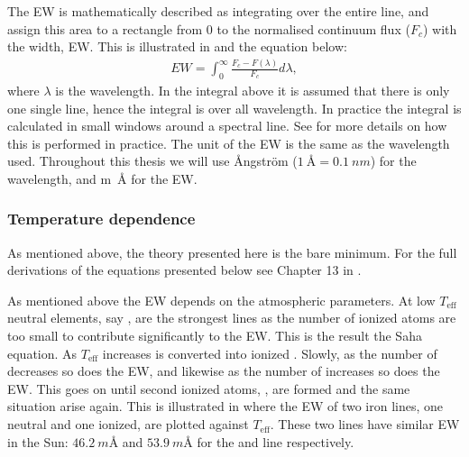 {The EW is mathematically described as integrating over the entire line, and assign this area to a
rectangle from 0 to the normalised continuum flux ($F_c$) with the width, EW. This is illustrated in
 and the equation below:
\begin{align} EW = \int_{0}^{\infty}
  \frac{F_c-F(\lambda)}{F_c} d\lambda,
\end{align}
where $\lambda$ is the wavelength. In the integral above it is assumed that there is only one single
line, hence the integral is over all wavelength. In practice the integral is calculated in small
windows around a spectral line. See  for more details on how this is performed
in practice. The unit of the EW is the same as the wavelength used. Throughout this thesis we will
use \AA{}ngstr\"{o}m ($\SI{1}{\angstrom}=\SI{0.1}{nm}$) for the wavelength, and \si{m\angstrom} for
the EW.


\subsubsection{Temperature dependence}

As mentioned above, the theory presented here is the bare minimum. For the full derivations of the
equations presented below see Chapter 13 in \citet{Gray2006}.

As mentioned above the EW depends on the atmospheric parameters. At low $T_\mathrm{eff}$ neutral
elements, say , are the strongest lines as the number of ionized atoms are too small to
contribute significantly to the EW. This is the result the Saha equation. As $T_\mathrm{eff}$
increases  is converted into ionized . Slowly, as the number of 
decreases so does the EW, and likewise as the number of  increases so does the EW. This
goes on until second ionized atoms, , are formed and the same situation arise again.
This is illustrated in  where the EW of two iron lines, one neutral and one
ionized, are plotted against $T_\mathrm{eff}$. These two lines have similar EW in the Sun:
$\SI{46.2}{m\angstrom}$ and $\SI{53.9}{m\angstrom}$ for the  and  line
respectively.

}
